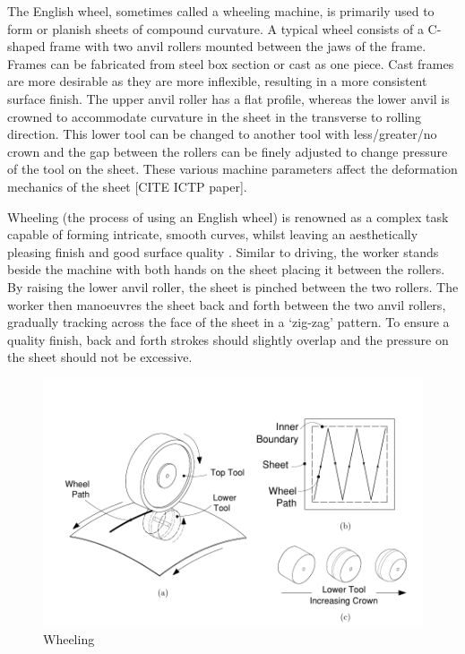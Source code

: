 The English wheel, sometimes called a wheeling machine, is primarily used to form or planish sheets of compound curvature. A typical wheel consists of a C-shaped frame with two anvil rollers mounted between the jaws of the frame. Frames can be fabricated from steel box section or cast as one piece. Cast frames are more desirable as they are more inflexible, resulting in a more consistent surface finish. The upper anvil roller has a flat profile, whereas the lower anvil is crowned to accommodate curvature in the sheet in the transverse to rolling direction. This lower tool can be changed to another tool with less/greater/no crown and the gap between the rollers can be finely adjusted to change pressure of the tool on the sheet. These various machine parameters affect the deformation mechanics of the sheet [CITE ICTP paper].

Wheeling (the process of using an English wheel) is renowned as a complex task capable of forming intricate, smooth curves, whilst leaving an aesthetically pleasing finish and good surface quality \citep{Longyard2014LearningWheel}. Similar to driving, the worker stands beside the machine with both hands on the sheet placing it between the rollers. By raising the lower anvil roller, the sheet is pinched between the two rollers. The worker then manoeuvres the sheet back and forth between the two anvil rollers, gradually tracking across the face of the sheet in a `zig-zag' pattern. To ensure a quality finish, back and forth strokes should slightly overlap and the pressure on the sheet should not be excessive. 

\begin{figure}[h]
    \centering
    \includegraphics[width=0.8\linewidth]{Images/WheelingTechDrawing.pdf}
    \caption{Wheeling}
    \label{fig:WheelingTech}
\end{figure}



